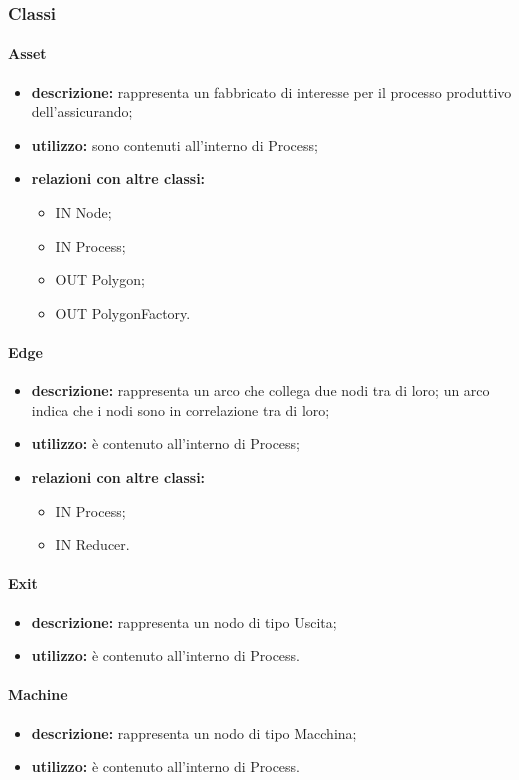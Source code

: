 \subsubsection{Classi}
\paragraph{Asset}
\begin{itemize}
	\item \textbf{descrizione:} rappresenta un fabbricato di interesse per il processo produttivo dell'assicurando;
	\item \textbf{utilizzo:} sono contenuti all'interno di Process;
	\item \textbf{relazioni con altre classi:} 
	\begin{itemize}
		\item IN Node;
		\item IN Process;
		\item OUT Polygon;
		\item OUT PolygonFactory.
	\end{itemize}
\end{itemize}
\paragraph{Edge}
\begin{itemize}
	\item \textbf{descrizione:} rappresenta un arco che collega due nodi tra di loro; un arco indica che i nodi sono in correlazione tra di loro;
	\item \textbf{utilizzo:} è contenuto all'interno di Process;
	\item \textbf{relazioni con altre classi:} 
	\begin{itemize}
		\item IN Process;
		\item IN Reducer.
	\end{itemize}
\end{itemize}
\paragraph{Exit}
\begin{itemize}
	\item \textbf{descrizione:} rappresenta un nodo di tipo Uscita;
	\item \textbf{utilizzo:} è contenuto all'interno di Process.
\end{itemize}
\paragraph{Machine}
\begin{itemize}
	\item \textbf{descrizione:} rappresenta un nodo di tipo Macchina;
	\item \textbf{utilizzo:} è contenuto all'interno di Process.
\end{itemize}

